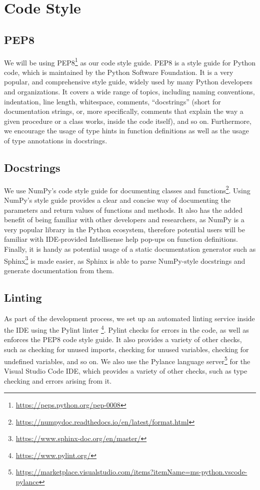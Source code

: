 \section{Code Style}
\subsection{PEP8}
We will be using PEP8\footnote{\url{https://peps.python.org/pep-0008}} \citep{pep8} as our code style guide. PEP8 is a style guide for Python code, which is maintained by the Python Software Foundation. It is a very popular, and comprehensive style guide, widely used by many Python developers and organizations. It covers a wide range of topics, including naming conventions, indentation, line length, whitespace, comments, ``docstrings'' (short for documentation strings, or, more specifically, comments that explain the way a given procedure or a class works, inside the code itself), and so on. Furthermore, we encourage the usage of type hints in function definitions as well as the usage of type annotations in docstrings.
\subsection{Docstrings}
We use NumPy's code style guide for documenting classes and functions\footnote{\url{https://numpydoc.readthedocs.io/en/latest/format.html}}. Using NumPy's style guide provides a clear and concise way of documenting the parameters and return values of functions and methods. It also has the added benefit of being familiar with other developers and researchers, as NumPy is a very popular library in the Python ecosystem, therefore potential users will be familiar with IDE-provided Intellisense help pop-ups on function definitions. Finally, it is handy as potential usage of a static documentation generator such as Sphinx\footnote{\url{https://www.sphinx-doc.org/en/master/}} is made easier, as Sphinx is able to parse NumPy-style docstrings and generate documentation from them.

\subsection{Linting}
As part of the development process, we set up an automated linting service inside the IDE using the Pylint linter \footnote{\url{https://www.pylint.org/}}. Pylint checks for errors in the code, as well as enforces the PEP8 code style guide. It also provides a variety of other checks, such as checking for unused imports, checking for unused variables, checking for undefined variables, and so on. We also use the Pylance language server\footnote{\url{https://marketplace.visualstudio.com/items?itemName=ms-python.vscode-pylance}} for the Visual Studio Code IDE, which provides a variety of other checks, such as type checking and errors arising from it.

